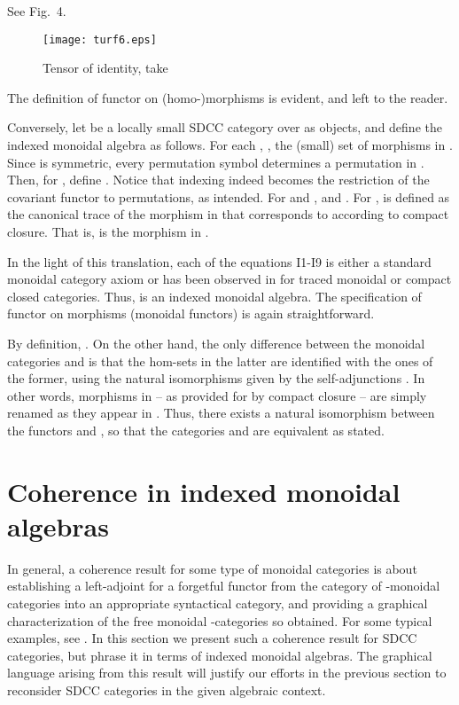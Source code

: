 \documentclass{eptcs}
\begin{document}
   
\vspp\newline
See Fig.\ 4.
\begin{figure}
\begin{center}
\texttt{[image: turf6.eps]}
\end{center}
\vspmini
\caption{Tensor of identity, take }
\vspmini 
\end{figure}
\vspe
The definition of functor  on (homo-)morphisms is evident, and left to the reader.

Conversely, let  be a locally small SDCC category over  as objects, and define the indexed
monoidal algebra  as follows. For each , , the (small) set of morphisms  in . Since 
is symmetric, every permutation symbol  determines a permutation
 in . Then, for ,
define . Notice that indexing
indeed becomes the restriction of the covariant  functor to permutations, as intended.
For  and ,  and
. For ,  is 
defined as the canonical trace of the morphism  in
 that corresponds to  according to compact closure. That is,
 is the morphism  in
.

In the light of this translation, each of
the equations I1-I9 is either a standard monoidal category axiom or has been observed
in \cite{tra,cc} for traced monoidal or compact closed categories.
Thus,  is an indexed monoidal algebra. The specification of
functor  on morphisms (monoidal functors) is again straightforward.

By definition, . On the other hand, the only difference
between the monoidal categories  and  is that the hom-sets 
 in the latter are identified with the ones  of the former,
using the natural isomorphisms given by the self-adjunctions . 
In other words, morphisms  in  -- as provided for by compact
closure -- are simply renamed as they appear in . Thus,
there exists a natural isomorphism between the functors  and ,
so that the categories  and  are equivalent as stated. 
\vege 
\section{Coherence in indexed monoidal algebras}
In general, a coherence result for some type  of monoidal categories is about
establishing a left-adjoint for a forgetful functor from the category  of
-monoidal categories into an appropriate syntactical category, and providing a graphical
characterization of the free monoidal -categories so obtained. For some typical
examples, see \cite{mcl,cc,acta,tcs}. In this section we present such a 
coherence result for SDCC categories, but phrase it in terms of indexed monoidal algebras.
The graphical language arising from this result will justify our efforts in the previous
section to reconsider SDCC categories in the given algebraic context.
\end{document}
